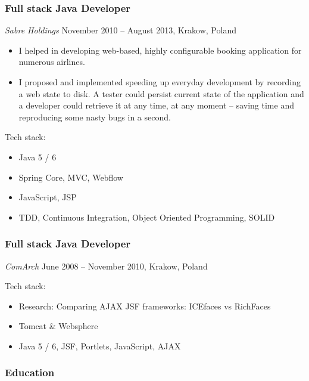 \documentclass[]{rss}
\providecommand{\tightlist}{%
  \setlength{\itemsep}{0pt}\setlength{\parskip}{0pt}}
\begin{document}
\begin{resume}
\subsubsection{Full stack Java
Developer}\label{full-stack-java-developer}

\emph{Sabre Holdings} November 2010 -- August 2013, Krakow, Poland

\begin{itemize}
\item
  I helped in developing web-based, highly configurable booking
  application for numerous airlines.
\item
  I proposed and implemented speeding up everyday development by
  recording a web state to disk. A tester could persist current state of
  the application and a developer could retrieve it at any time, at any
  moment -- saving time and reproducing some nasty bugs in a second.
\end{itemize}

Tech stack:

\begin{itemize}
\tightlist
\item
  Java 5 / 6
\item
  Spring Core, MVC, Webflow
\item
  JavaScript, JSP
\item
  TDD, Continuous Integration, Object Oriented Programming, SOLID
\end{itemize}

\subsubsection{Full stack Java
Developer}\label{full-stack-java-developer-1}

\emph{ComArch} June 2008 -- November 2010, Krakow, Poland

Tech stack:

\begin{itemize}
\tightlist
\item
  Research: Comparing AJAX JSF frameworks: ICEfaces vs RichFaces
\item
  Tomcat \& Websphere
\item
  Java 5 / 6, JSF, Portlets, JavaScript, AJAX
\end{itemize}

\subsubsection{Education}\label{education}


\end{resume}
\end{document}
